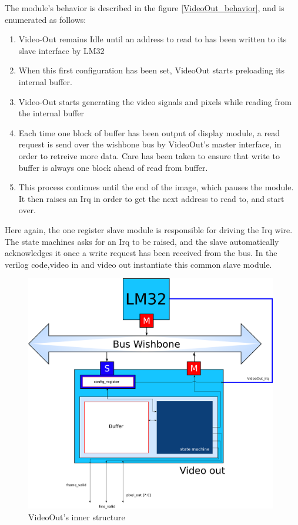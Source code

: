 The module's behavior is described in the figure \ref{VideoOut_behavior}, and is enumerated as follows:
\begin{enumerate}
\item Video-Out remains Idle until an address to read to has been written to its slave interface by LM32
\item When this first configuration has been set, VideoOut starts preloading its internal buffer.
\item Video-Out starts generating the video signals and  pixels while reading from the internal buffer 
\item Each time one block of buffer has been output of display module, a read request is send over the wishbone bus by VideoOut's master interface, in order to retreive more data. Care has been taken to ensure that write to buffer is always one block ahead of read from buffer.
\item This process continues until the end of the image, which pauses the module. It then raises an Irq in order to get the next address to read to, and start over.
\end{enumerate}

Here again, the one register slave module is responsible for driving the Irq wire.
The state machines asks for an Irq to be raised, and the slave automatically acknowledges it once a write request has been received from the bus. In the verilog code,video in and video out instantiate this common slave module.

\vfill
\begin{figure}[h]
\center
\includegraphics[width=11cm]{figs/Video_Out_blocks.pdf}
\caption{VideoOut's inner structure}
\label{VideoOut_struct}
\end{figure}
\vfill

